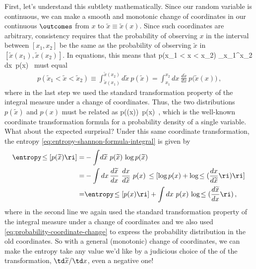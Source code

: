 First, let's understand this subtlety mathematically. Since our random variable is continuous, we can make a smooth and monotonic change of coordinates in our continuous  $\outcomes$ from $x$ to $\widetilde{x}\equiv\widetilde{x}(x)$. Since such coordinates are arbitrary, consistency requires that the probability of observing $x$ in the interval between $[x_1,x_2]$ be the same as the probability of observing $\widetilde{x}$ in $[\widetilde{x}(x_1),\widetilde{x}(x_2)]$.
In equations, this means that
\be
p(x_1 < x < x_2) \equiv \int_{x_1}^{x_2} dx\ p(x) \, 
\ee
must equal
\begin{align}
p(\widetilde{x}_1 < \widetilde x < \widetilde{x}_2)\equiv\int_{\widetilde{x}(x_1)}^{\widetilde{x}(x_2)} d\widetilde{x}\ p(\widetilde{x})=\int_{x_1}^{x_2} dx\  \frac{d\widetilde{x}}{dx}\ p\Big(\widetilde{x}(x)\Big)\, ,
\end{align}
where in the last step we used the standard transformation property of the integral measure under a change of coordinates.
Thus, the two distributions $p(\widetilde{x})$ and $p(x)$ must be related as
\be\label{eq:probability-coordinate-change}
p\Big((x)\Big)\equiv{}\ p(x)\, ,
\ee
which is the well-known coordinate transformation formula for a probability density of a single variable. What about the expected surprisal? 
Under this same coordinate transformation, the entropy \eqref{eq:entropy-shannon-formula-integral} is given by
\begin{align}\label{eq:entropy-shift-coordinate}
\entropy\!\le[ p(\widetilde{x})\ri]=&-\int\! d\widetilde{x}\ p(\widetilde{x})\, \log p(\widetilde{x}) \, \\
=& -\int dx \, \frac{d\widetilde{x}}{dx}\ \frac{dx}{d\widetilde{x}}\ p(x)\, \le[\log p(x) +\log\!\le(\frac{dx}{d\widetilde{x}}\ri) \ri]\, \notag\\
=& \entropy\!\le[ p(x)\ri]+\int dx \ p(x)\, \log\!\le(\frac{d\widetilde{x}}{dx}\ri)\, ,\notag
\end{align}
where in the second line we again used the standard transformation property of the integral measure under a change of coordinates and we also used \eqref{eq:probability-coordinate-change} to express the probability distribution in the old coordinates. 
So with a general (monotonic) change of coordinates, we can make the entropy take any value we'd like by a judicious choice of the  of the transformation, $\td \widetilde{x} / \td x$, even a negative one!



